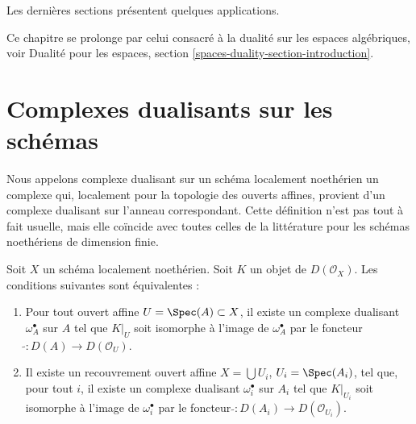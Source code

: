 \medskip\noindent
Les dernières sections présentent quelques applications.

\medskip\noindent
Ce chapitre se prolonge par celui consacré à la dualité sur les espaces algébriques, voir Dualité pour les espaces, section \ref{spaces-duality-section-introduction}.







\section{Complexes dualisants sur les schémas}
\label{section-dualizing-schemes}

\noindent
Nous appelons complexe dualisant sur un schéma localement noethérien un complexe qui, localement pour la topologie des ouverts affines, provient d'un complexe dualisant sur l'anneau correspondant. Cette définition n'est pas tout à fait usuelle, mais elle coïncide avec toutes celles de la littérature pour les schémas noethériens de dimension finie.

\begin{lemma}
\label{lemma-equivalent-definitions}
Soit $X$ un schéma localement noethérien. Soit $K$ un objet de $D(\mathcal{O}_X)$. Les conditions suivantes sont équivalentes :
\begin{enumerate}
\item Pour tout ouvert affine $U = \Spec(A) \subset X$, il existe un complexe dualisant $\omega_A^\bullet$ sur $A$ tel que $K|_U$ soit isomorphe à l'image de $\omega_A^\bullet$ par le foncteur $\widetilde{} : D(A) \to D(\mathcal{O}_U)$.
\item Il existe un recouvrement ouvert affine $X = \bigcup U_i$, $U_i = \Spec(A_i)$, tel que, pour tout $i$, il existe un complexe dualisant $\omega_i^\bullet$ sur $A_i$ tel que $K|_{U_i}$ soit isomorphe à l'image de $\omega_i^\bullet$ par le foncteur $\widetilde{} : D(A_i) \to D(\mathcal{O}_{U_i})$.
\end{enumerate}
\end{lemma}

